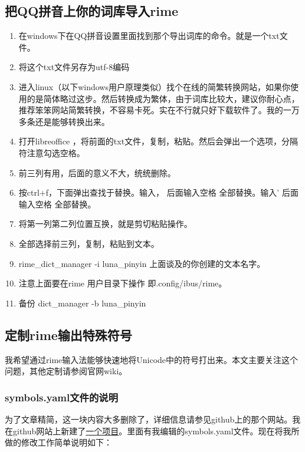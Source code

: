 \documentclass[11pt,oneside]{book}
\begin{document}
\subsection{把QQ拼音上你的词库导入rime}
\begin{enumerate}
\item 在windows下在QQ拼音设置里面找到那个导出词库的命令。就是一个txt文件。
\item 将这个txt文件另存为utf-8编码
\item 进入linux（以下windows用户原理类似）找个在线的简繁转换网站，如果你使用的是简体略过这步。然后转换成为繁体，由于词库比较大，建议你耐心点，推荐笨笨网站简繁转换，不容易卡死。实在不行就只好下载软件了。我的一万多条还是能够转换出来。
\item 打开libreoffice ，将前面的txt文件，复制，粘贴。然后会弹出一个选项，分隔符注意勾选空格。
\item 前三列有用，后面的意义不大，统统删除。
\item 按ctrl+f，下面弹出查找于替换。输入，  后面输入空格   全部替换。输入'     后面输入空格   全部替换。
\item 将第一列第二列位置互换，就是剪切粘贴操作。
\item 全部选择前三列，复制，粘贴到文本。
\item rime\_dict\_manager  -i luna\_pinyin   上面谈及的你创建的文本名字。
\item 注意上面要在rime 用户目录下操作  即.config/ibus/rime。
\item 备份   dict\_manager -b luna\_pinyin  
\end{enumerate}


\subsection{定制rime输出特殊符号}
\begin{flushright}
\begin{notecard}[olive!30]{15em}
我希望通过rime输入法能够快速地将Unicode中的符号打出来。本文主要关注这个问题，其他定制请参阅官网wiki。
\end{notecard}
\end{flushright}

\subsubsection{symbols.yaml文件的说明}
为了文章精简，这一块内容大多删除了，详细信息请参见github上的那个网站。我在github网站上新建了\href{https://github.com/a358003542/rime-symbols-yaml}{一个项目}。里面有我编辑的symbols.yaml文件。现在将我所做的修改工作简单说明如下：
\end{document}
